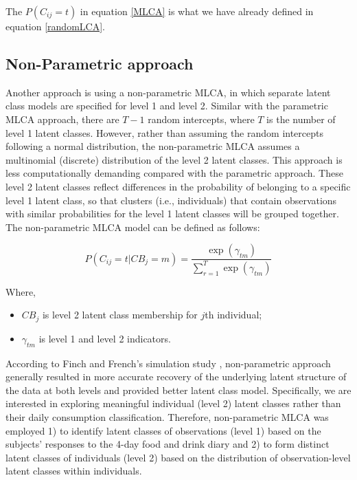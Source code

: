 The $P(C_{ij} = t)$ in equation \ref{MLCA} is what we have already defined in equation \ref{randomLCA}.

\vspace{-0.5cm}
\subsection{Non-Parametric approach}\vspace{-0.3cm}


Another approach is using a non-parametric MLCA, in which separate latent class models are specified for level 1 and level 2. Similar with the parametric MLCA approach, there are $T-1$ random intercepts, where $T$ is the number of level 1 latent classes. However, rather than assuming the random intercepts following a normal distribution, the non-parametric MLCA assumes a multinomial (discrete) distribution of the level 2 latent classes. This approach is less computationally demanding compared with the parametric approach. These level 2 latent
classes reflect differences in the probability of belonging to a specific level 1 latent class, so that clusters (i.e., individuals) that contain observations with similar probabilities for the level 1 latent classes will be grouped together. The non-parametric MLCA model can be defined as follows: \vspace{-0.7cm}

\begin{equation}
P(C_{ij} = t | CB_j = m)  = \frac{\exp(\gamma_{tm})}{\sum_{r=1}^{T}\exp(\gamma_{tm})}
\end{equation}

Where, 

\begin{itemize}
	\item $CB_j$ is level 2 latent class membership for $j$th individual;
	\item $\gamma_{tm}$ is level 1 and level 2 indicators.
\end{itemize}

According to Finch and French's simulation study \parencite{finch2014multilevel}, non-parametric approach generally resulted in more accurate recovery of the underlying latent structure of the data at both levels and provided better latent class model. Specifically, we are interested in exploring meaningful individual (level 2) latent classes rather than their daily consumption classification. Therefore, non-parametric MLCA was employed 1) to identify latent classes of observations (level 1) based on the subjects' responses to the 4-day food and drink diary and 2) to form distinct latent classes of individuals (level 2) based on the distribution of observation-level latent classes within individuals.
 


